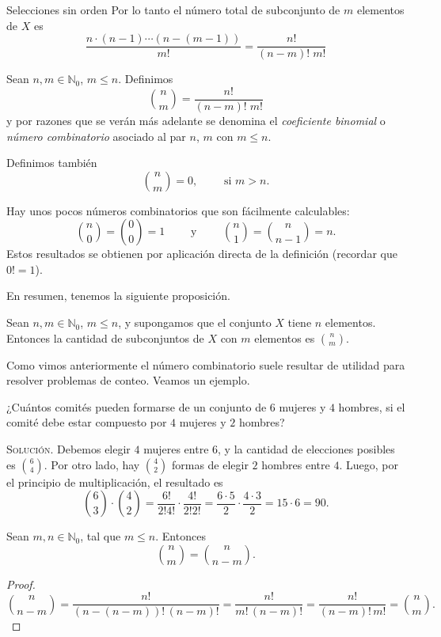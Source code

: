 \begin{section}{Selecciones sin orden}
Por lo tanto el número total de subconjunto de $m$ elementos
de $X$ es
$$
\frac{n \cdot (n - 1) \cdots (n - (m - 1))}{m!} = \frac{n!}{(n - m)!\; m!}
$$

\begin{definicion}
Sean $n, m \in \mathbb N_0$, $m \le n$. Definimos
$$
\binom{n}{m} = \frac{n!}{(n - m)! \; m!}
$$
y por razones que se verán más adelante se denomina el {\em coeficiente binomial} o {\em número combinatorio} asociado al par $n$, $m$ con $m \le n$.


Definimos también
$$
\binom{n}{m} = 0,\qquad \text{ si } m > n.
$$
\end{definicion}

\begin{observacion*} Hay unos pocos números combinatorios que son fácilmente calculables: 
$$
\binom{n}{0} = \binom{0}{0} = 1 \qquad \text{ y }\qquad  \binom{n}{1} = \binom{n}{n-1} = n. 
$$
Estos resultados se obtienen por aplicación directa de la definición (recordar que  $0! =1$). 
\end{observacion*}

En resumen, tenemos la siguiente proposición.

\begin{proposicion}
Sean $n, m \in \mathbb N_0$, $m \le n$, y supongamos que el conjunto $X$ tiene $n$ elementos.
Entonces la cantidad de subconjuntos de $X$ con $m$ elementos es
$
\displaystyle\binom{n}{m}
$.
\end{proposicion}

Como vimos anteriormente el número combinatorio suele resultar de utilidad para resolver pro\-ble\-mas de conteo. Veamos un ejemplo.

\begin{ejemplo*}
 ¿Cuántos comités pueden formarse de un conjunto de $6$ mujeres y $4$ hombres, si el comité debe estar compuesto por $4$ mujeres y $2$ hombres?

\textsc{Solución.} Debemos elegir $4$ mujeres entre $6$, y la cantidad de elecciones posibles es   $\binom{6}{4}$. Por otro lado, hay $ \binom{4}{2}$ formas de elegir $2$ hombres entre $4$. Luego, por el principio de multiplicación,  el resultado es
$$
\binom{6}{3}\cdot \binom{4}{2} = \frac{6!}{2!4!}\cdot\frac{4!}{2!2!} = \frac{6\cdot 5}{2}\cdot\frac{4\cdot 3}{2} = 15 \cdot 6 = 90.
$$
\end{ejemplo*}




\begin{proposicion}\label{simcomb}
Sean $m,n \in \mathbb N_0$, tal que $m \le n$. Entonces
$$
\binom{n}{m} = \binom{n}{n-m}.
$$
\end{proposicion}
\begin{proof}
$$
\binom{n}{n-m} = \frac{n!}{(n-(n-m))!\,(n-m)!} =  \frac{n!}{m!\,(n-m)!} =   \frac{n!}{(n-m)!\,m!} = \binom{n}{m}.
$$
\end{proof}



\end{section}
